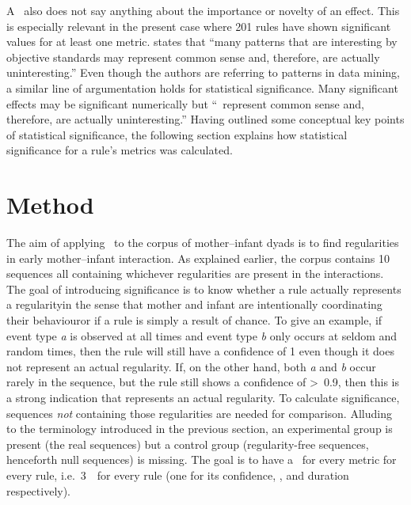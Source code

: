 A \pv\ also does not say anything about the importance or novelty of an effect.
This is especially relevant in the present case where 201 rules have shown significant values for at least one metric.
\citet[]{han_data_2012} states that ``many patterns that are interesting by objective standards may represent common sense and, therefore, are actually uninteresting.''
Even though the authors are referring to patterns in data mining, a similar line of argumentation holds for statistical significance.
Many significant effects may be significant numerically but ``\citeellipses\ represent common sense and, therefore, are actually uninteresting.''
Having outlined some conceptual key points of statistical significance, the following section explains how statistical significance for a rule's metrics was calculated.




\section{Method}
\label{sec:sigmet}
The aim of applying \fpmlower\ to the corpus of mother--infant dyads is to find regularities in early mother--infant interaction.
As explained earlier, the corpus contains 10 sequences all containing whichever regularities are present in the interactions.
The goal of introducing significance is to know whether a rule actually represents a regularity\dash in the sense that mother and infant are intentionally coordinating their behaviour\dash or if a rule is simply a result of chance.
To give an example, if event type \emph{a} is observed at all times and event type \emph{b} only occurs at seldom and random times, then the rule  will still have a confidence of 1 even though it does not represent an actual regularity.
If, on the other hand, both \emph{a} and \emph{b} occur rarely in the sequence, but the rule still shows a confidence of >~0.9, then this is a strong indication that  represents an actual regularity.
To calculate significance, sequences \emph{not} containing those regularities are needed for comparison.
Alluding to the terminology introduced in the previous section, an experimental group is present (the real sequences) but a control group (regularity-free sequences, henceforth null sequences) is missing.
The goal is to have a \pv\ for every metric for every rule, i.e.~3~\pv\ for every rule (one for its confidence, \noc, and duration respectively).%

